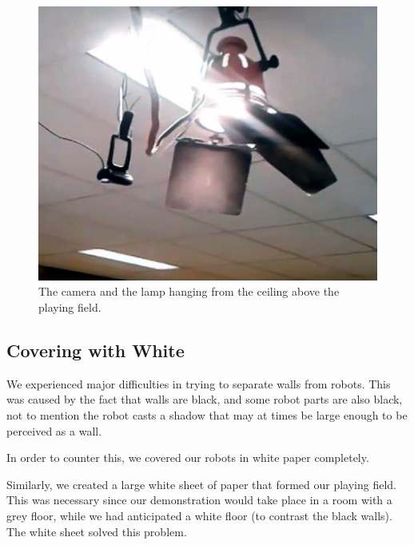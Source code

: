 \documentclass[10pt, abstracton, twocolumn]{scrartcl}
\begin{document}
\begin{figure}[h]
	\centering
	\includegraphics[width=\columnwidth]{pictures/photo2light.png}
	\caption{\small The camera and the lamp hanging from the ceiling above the playing field.}
	\label{fig:photo2light}
\end{figure}

\subsection{Covering with White}
We experienced major difficulties in trying to separate walls from robots. This was caused by the fact that walls are black, and some robot parts are also black, not to mention the robot casts a shadow that may at times be large enough to be perceived as a wall.

In order to counter this, we covered our robots in white paper completely.

Similarly, we created a large white sheet of paper that formed our playing field. This was necessary since our demonstration would take place in a room with a grey floor, while we had anticipated a white floor (to contrast the black walls). The white sheet solved this problem.




\newpage
\end{document}
